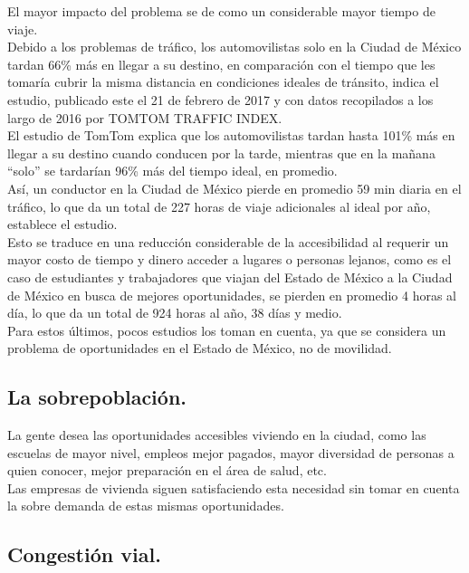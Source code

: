 \documentclass[10pt]{article}
\begin{document}
El mayor impacto del problema se de como un considerable mayor tiempo de viaje.\\

Debido a los problemas de tráfico, los automovilistas solo en la Ciudad de México tardan 66\% más en llegar a su destino, en comparación con el tiempo que les tomaría cubrir la misma distancia en condiciones ideales de tránsito, indica el estudio, publicado este el 21 de febrero de 2017 y con datos recopilados a los largo de 2016 por TOMTOM TRAFFIC INDEX. \\

El estudio de TomTom explica que los automovilistas tardan hasta 101\% más en llegar a su destino cuando conducen por la tarde, mientras que en la mañana “solo” se tardarían 96\% más del tiempo ideal, en promedio.\\

Así, un conductor en la Ciudad de México pierde en promedio 59 min diaria en el tráfico, lo que da un total de 227 horas de viaje adicionales al ideal por año, establece el estudio.\\

Esto se traduce en una reducción considerable de la accesibilidad al requerir un mayor costo de tiempo y dinero acceder a lugares o personas lejanos, como es el caso de estudiantes y trabajadores que viajan del Estado de México a la Ciudad de México en busca de mejores oportunidades, se pierden en promedio 4 horas al día, lo que da un total de 924 horas al año, 38 días y medio.\\

Para estos últimos, pocos estudios los toman en cuenta, ya que se considera un problema de oportunidades en el Estado de México, no de movilidad.\\

\subsection{La sobrepoblación.}

La gente desea las oportunidades accesibles viviendo en la ciudad, como las escuelas de mayor nivel, empleos mejor pagados, mayor diversidad de personas a quien conocer, mejor preparación en el área de salud, etc.  \\

Las empresas de vivienda siguen satisfaciendo esta necesidad sin tomar en cuenta la sobre demanda de estas mismas oportunidades.  

\subsection{Congestión vial.}
\end{document}
